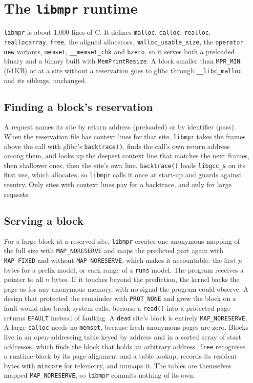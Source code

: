\documentclass[11pt]{article}
\newcommand{\libmpr}{\texttt{libmpr}}
\newcommand{\pass}{\texttt{MemPrintResize}}
\begin{document}
\section{The \libmpr{} runtime}
\label{sec:runtime}

\libmpr{} is about 1{,}000 lines of C. It defines \texttt{malloc}, \texttt{calloc}, \texttt{realloc},
\texttt{reallocarray}, \texttt{free}, the aligned allocators, \texttt{malloc\_usable\_size}, the \texttt{operator new}
variants, \texttt{memset}, \texttt{\_\_memset\_chk} and \texttt{bzero}, so it serves both a preloaded binary and a binary
built with \pass{}. A block smaller than \texttt{MPR\_MIN} (64\,KB) or at a site without a reservation goes to glibc
through \texttt{\_\_libc\_malloc} and its siblings, unchanged.

\subsection{Finding a block's reservation}

A request names its site by return address (preloaded) or by identifier (pass). When the reservation file has
context lines for that site, \libmpr{} takes the frames above the call with glibc's \texttt{backtrace()}, finds the
call's own return address among them, and looks up the deepest context line that matches the next frames, then
shallower ones, then the site's own line. \texttt{backtrace()} loads \texttt{libgcc\_s} on its first use, which
allocates, so \libmpr{} calls it once at start-up and guards against reentry. Only sites with context lines pay for
a backtrace, and only for large requests.

\subsection{Serving a block}

For a large block at a reserved site, \libmpr{} creates one anonymous mapping of the full size with
\texttt{MAP\_NORESERVE} and maps the predicted part again with \texttt{MAP\_FIXED} and without
\texttt{MAP\_NORESERVE}, which makes it accountable: the first $p$ bytes for a prefix model, or each range of a
\texttt{runs} model. The program receives a pointer to all $n$ bytes. If it touches beyond the prediction, the
kernel backs the page as for any anonymous memory, with no signal the program could observe. A design that
protected the remainder with \texttt{PROT\_NONE} and grew the block on a fault would also break system calls,
because a \texttt{read()} into a protected page returns \texttt{EFAULT} instead of faulting. A \texttt{dead} site's block is
entirely \texttt{MAP\_NORESERVE}. A large \texttt{calloc} needs no \texttt{memset}, because fresh anonymous pages are zero.
Blocks live in an open-addressing table keyed by address and in a sorted array of start addresses, which finds
the block that holds an arbitrary address. \texttt{free} recognises a runtime block by its page alignment and a table
lookup, records its resident bytes with \texttt{mincore} for telemetry, and unmaps it. The tables are themselves
mapped \texttt{MAP\_NORESERVE}, so \libmpr{} commits nothing of its own.
\end{document}
